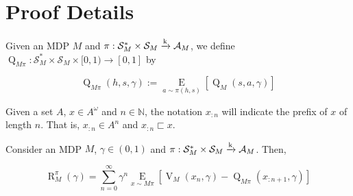 \documentclass[anon,12pt]{colt2018} %
\newcommand{\AP}[1]{\left(#1\right)}
\newcommand{\AB}[1]{\left[#1\right]}
\newcommand{\Ea}[2]{\underset{#1}{\operatorname{E}}\AB{#2}}
\newcommand{\Nats}{\mathbb{N}}
\newcommand{\K}{\xrightarrow{\textnormal{k}}}
\newcommand{\A}{\mathcal{A}}
\newcommand{\St}{\mathcal{S}}
\newcommand{\V}{\operatorname{V}}
\newcommand{\Q}{\operatorname{Q}}
\newcommand{\Rg}{\operatorname{R}}
\begin{document}





\appendix

\section{Proof Details}
\label{sec:details}

\begin{samepage}
\begin{definition}

Given an MDP $M$ and $\pi: \St_M^* \times \St_M \K \A_M$, we define $\Q_{M\pi}: \St_M^* \times \St_M \times [0,1) \rightarrow [0,1]$ by

\begin{equation}
\Q_{M\pi}(h,s,\gamma):=\Ea{a\sim\pi(h,s)}{\Q_M(s,a,\gamma)}
\end{equation}

\end{definition}
\end{samepage}

Given a set $A$, $x\in A^\omega$ and $n\in\Nats$, the notation $x_{:n}$ will indicate the prefix of $x$ of length $n$. That is, $x_{:n} \in A^n$ and $x_{:n} \sqsubset x$.

\begin{samepage}
\begin{proposition}
\label{prp:regret_vq}

Consider an MDP $M$, $\gamma\in(0,1)$ and $\pi: \St_M^* \times \St_M \K \A_{M}$. Then,

\begin{equation}
\Rg_{M}^{\pi}(\gamma)=\sum_{n=0}^\infty {\gamma^n \Ea{x\sim M\pi}{\V_{M}\AP{x_n,\gamma}-\Q_{M\pi}\AP{x_{:n+1},\gamma}}}
\end{equation}

\end{proposition}
\end{samepage}
\end{document}
